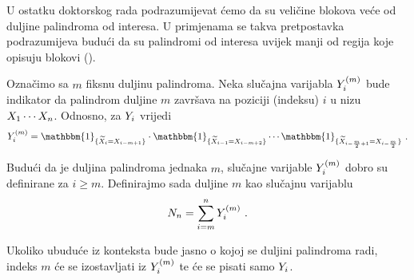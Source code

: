 U ostatku doktorskog rada podrazumijevat ćemo da su veličine blokova
veće od duljine palindroma od interesa. U primjenama
se takva pretpostavka podrazumijeva budući da su palindromi
od interesa uvijek manji od regija koje opisuju blokovi
(\textcite{lisnic_palindrome_2005}).

Označimo sa $m$ fiksnu duljinu palindroma. Neka slučajna varijabla
$\tsvar{Y}_i^{(m)}$ bude indikator da palindrom duljine $m$ završava na poziciji
(indeksu) $i$ u nizu $\tsvar{X}_1\cdots\tsvar{X}_n$. Odnosno, za $\tsvar{Y}_i$ vrijedi
\begin{equation}
	\label{df:palindromslvar}
	\tsvar{Y}_i^{(m)}=
	\mathbbm{1}_{\{ \ol{\tsvar{X}}_{i} = \tsvar{X}_{i-m+1}\}} \cdot
	\mathbbm{1}_{\{ \ol{\tsvar{X}}_{i-1} = \tsvar{X}_{i-m+2}\}} \cdots
	\mathbbm{1}_{\{ \ol{\tsvar{X}}_{i-\frac{m}{2}+1} = \tsvar{X}_{i-\frac{m}{2}}\}} 
	\ .
\end{equation}

Budući da je duljina palindroma jednaka $m$, slučajne varijable
$\tsvar{Y}_i^{(m)}$ dobro su definirane za $i \geq m$.
Definirajmo sada  duljine $m$ kao slučajnu varijablu
\begin{equation}
	\label{df:brojpalindroma}
	\tsvar{N}_n = \sum_{i=m}^{n} \tsvar{Y}_i^{(m)} \ .
\end{equation}

Ukoliko ubuduće iz konteksta bude jasno o kojoj se duljini palindroma
radi, indeks $m$ će se izostavljati iz $\tsvar{Y}_i^{(m)}$ te će se pisati
samo $\tsvar{Y}_i$.
